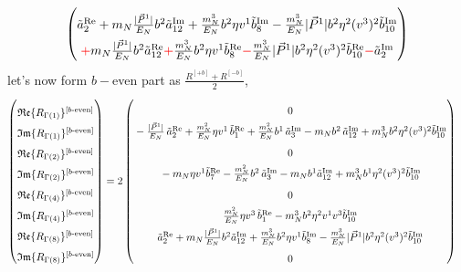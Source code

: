 \documentclass[]{article}
\numberwithin{equation}{section}
\newcommand{\bvec}{b}
\newcommand{\mN}{m_N}
\begin{document}
\begin{align}
\begin{pmatrix}
      \rule{0pt}{16pt}  \tilde a^{\text{Re}}_2 + \mN  \frac{|\vec{P}^1|}{E_N} \bvec^2  \tilde a^{\text{Im}}_{12}+ \frac{  \mN^3}{E_N}  \bvec^2 \eta v^1  \tilde b^{\text{Im}}_8- \frac{ \mN^3}{E_N}  |\vec{P}^1| \bvec^2 \eta^2 (v^3)^2 \tilde b^{\text{Im}}_{10}\\
      \rule{0pt}{16pt} \textcolor{red}{+}  \mN  \frac{|\vec{P}^1|}{E_N} \bvec^2  \tilde a^{\text{Re}}_{12}\textcolor{red}{+} \frac{  \mN^3}{E_N}  \bvec^2 \eta v^1  \tilde b^{\text{Re}}_8 \textcolor{red}{-} \frac{ \mN^3}{E_N}  |\vec{P}^1| \bvec^2 \eta^2 (v^3)^2 \tilde b^{\text{Re}}_{10}\textcolor{red}{-}\tilde a^{\text{Im}}_2
    \end{pmatrix}
\end{align}
let's now form $b-$even part as $\frac{R^{[+b]}+R^{[-b]}}{2}$,
\begin{align}
    \begin{pmatrix}
        \rule{0pt}{16pt} \mathfrak{Re}\{ R_{\Gamma(1)}\}^{[b\text{-even}]} \\
        \rule{0pt}{16pt} \mathfrak{Im}\{ R_{\Gamma(1)}\}^{[b\text{-even}]} \\
        \rule{0pt}{16pt} \mathfrak{Re}\{ R_{\Gamma(2)}\}^{[b\text{-even}]} \\
        \rule{0pt}{16pt} \mathfrak{Im}\{ R_{\Gamma(2)}\}^{[b\text{-even}]} \\
        \rule{0pt}{16pt} \mathfrak{Re}\{ R_{\Gamma(4)}\}^{[b\text{-even}]} \\
        \rule{0pt}{16pt} \mathfrak{Im}\{ R_{\Gamma(4)}\}^{[b\text{-even}]} \\
        \rule{0pt}{16pt} \mathfrak{Re}\{ R_{\Gamma(8)}\}^{[b\text{-even}]} \\
        \rule{0pt}{16pt} \mathfrak{Im}\{ R_{\Gamma(8)}\}^{[b\text{-even}]}
    \end{pmatrix} &= 2\begin{pmatrix}
     \rule{0pt}{16pt}   0\\
      \rule{0pt}{16pt}  -\frac{|\vec{P}^1|}{E_N}\, \tilde a^{\text{Re}}_2+ \frac{\mN^2}{E_N} \eta v^1\, \tilde b^{\text{Re}}_1 + \frac{\mN^2}{E_N} \bvec^1\, \tilde a^{\text{Im}}_3-  \mN  \bvec^2 \, \tilde a^{\text{Im}}_{12}+  \mN^3  \bvec^2 \eta^2 (v^3)^2 \tilde b^{\text{Im}}_{10}\\
      \rule{0pt}{16pt}  0 \\
      \rule{0pt}{16pt} - \mN \eta v^1  \tilde b^{\text{Re}}_7 -  \frac{\mN^2}{E_N} \bvec^2\, \tilde a^{\text{Im}}_3
		-  \mN   \bvec^1  \tilde a^{\text{Im}}_{12}+ \mN^3  \bvec^1 \eta^2 (v^3)^2 \tilde b^{\text{Im}}_{10}\\
      \rule{0pt}{16pt} 0\\
      \rule{0pt}{16pt} \frac{\mN^2}{E_N} \eta v^3\, \tilde b^{\text{Re}}_1 -\mN^3 \bvec^2 \eta^2 v^1 v^3\tilde b^{\text{Im}}_{10}\\
      \rule{0pt}{16pt}  \tilde a^{\text{Re}}_2 +  \mN  \frac{|\vec{P}^1|}{E_N} \bvec^2  \tilde a^{\text{Im}}_{12}+ \frac{  \mN^3}{E_N}  \bvec^2 \eta v^1  \tilde b^{\text{Im}}_8- \frac{ \mN^3}{E_N}  |\vec{P}^1| \bvec^2 \eta^2 (v^3)^2 \tilde b^{\text{Im}}_{10}\\
      \rule{0pt}{16pt} 0
    \end{pmatrix}
\end{align}
\end{document}
